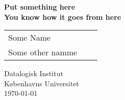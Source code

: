 \documentclass[a4paper]{article}
\begin{document}
	\AddToShipoutPicture*{\BackgroundPic}

	\begin{titlepage}
		\thispagestyle{empty}
		\vspace*{5cm}
		\begin{center}
			\Huge \textbf{Put something here} \\
      \LARGE \textbf{You know how it goes from here} \\
		\end{center}
		\vspace*{3.5cm}
		\begin{flushleft}

		\begin{table}[h!]
			\begin{tabular}{lll}	
      Some Name&\\ Some other namme\\
			\end{tabular}
		\end{table}
			\vspace{3mm}
			\vspace{3mm}
			Datalogisk  Institut\\
			Københavns Universitet\\
			\vspace{3mm}
			\today\\

		\end{flushleft}
	\end{titlepage}

	\title{}
	\author{}

	\newpage
\newpage




\end{document}
